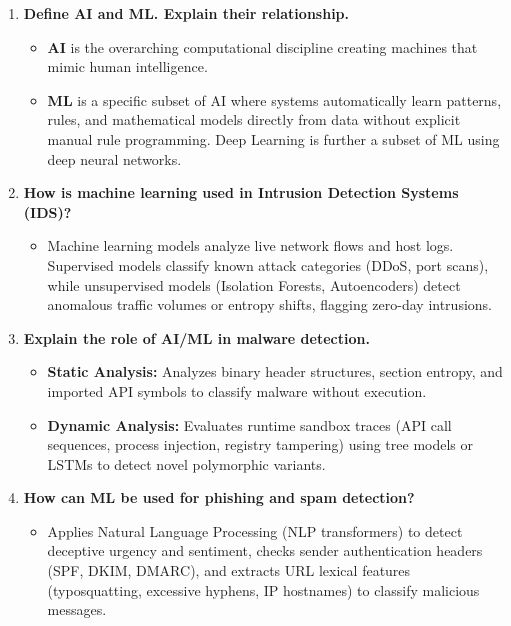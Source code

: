 \begin{enumerate}[label=\textbf{Q\arabic*.,resume},leftmargin=1.2cm]
\item \textbf{Define AI and ML. Explain their relationship.}
\begin{itemize}
\item \textbf{AI} is the overarching computational discipline creating machines that mimic human intelligence.
\item \textbf{ML} is a specific subset of AI where systems automatically learn patterns, rules, and mathematical models directly from data without explicit manual rule programming. Deep Learning is further a subset of ML using deep neural networks.
\end{itemize}

\item \textbf{How is machine learning used in Intrusion Detection Systems (IDS)?}
\begin{itemize}
\item Machine learning models analyze live network flows and host logs. Supervised models classify known attack categories (DDoS, port scans), while unsupervised models (Isolation Forests, Autoencoders) detect anomalous traffic volumes or entropy shifts, flagging zero-day intrusions.
\end{itemize}

\item \textbf{Explain the role of AI/ML in malware detection.}
\begin{itemize}
\item \textbf{Static Analysis:} Analyzes binary header structures, section entropy, and imported API symbols to classify malware without execution.
\item \textbf{Dynamic Analysis:} Evaluates runtime sandbox traces (API call sequences, process injection, registry tampering) using tree models or LSTMs to detect novel polymorphic variants.
\end{itemize}

\item \textbf{How can ML be used for phishing and spam detection?}
\begin{itemize}
\item Applies Natural Language Processing (NLP transformers) to detect deceptive urgency and sentiment, checks sender authentication headers (SPF, DKIM, DMARC), and extracts URL lexical features (typosquatting, excessive hyphens, IP hostnames) to classify malicious messages.
\end{itemize}


\end{enumerate}
